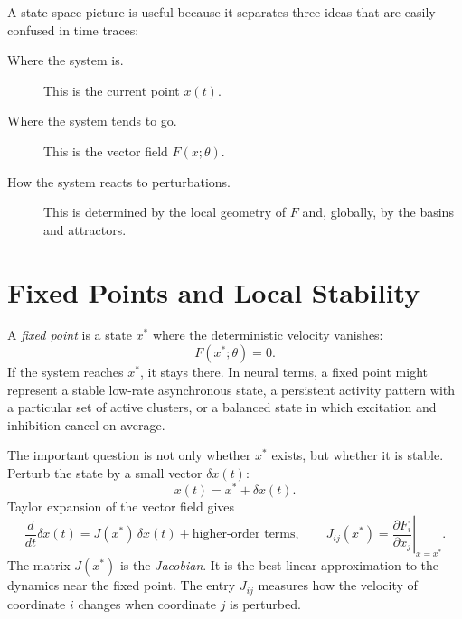 A state-space picture is useful because it separates three ideas that are easily confused in time traces:

\begin{description}
  \item[Where the system is.] This is the current point $x(t)$.
  \item[Where the system tends to go.] This is the vector field $F(x;\theta)$.
  \item[How the system reacts to perturbations.] This is determined by the local geometry of $F$ and, globally, by the basins and attractors.
\end{description}

\section{Fixed Points and Local Stability}
\label{sec:fixed-points-local-stability}

A \emph{fixed point} is a state $x^\ast$ where the deterministic velocity vanishes:
%
\begin{equation}
  F(x^\ast;\theta)=0.
  \label{eq:fixed-point}
\end{equation}
%
If the system reaches $x^\ast$, it stays there. In neural terms, a fixed point might represent a stable low-rate asynchronous state, a persistent activity pattern with a particular set of active clusters, or a balanced state in which excitation and inhibition cancel on average.

The important question is not only whether $x^\ast$ exists, but whether it is stable. Perturb the state by a small vector $\delta x(t)$:
%
\begin{equation}
  x(t) = x^\ast + \delta x(t).
  \label{eq:perturbation-definition}
\end{equation}
%
Taylor expansion of the vector field gives
%
\begin{equation}
  \frac{d}{dt}\delta x(t)
  =
  J(x^\ast)\,\delta x(t)
  + \text{higher-order terms},
  \qquad
  J_{ij}(x^\ast)
  =
  \left.\frac{\partial F_i}{\partial x_j}\right|_{x=x^\ast}.
  \label{eq:linearization-jacobian}
\end{equation}
%
The matrix $J(x^\ast)$ is the \emph{Jacobian}. It is the best linear approximation to the dynamics near the fixed point. The entry $J_{ij}$ measures how the velocity of coordinate $i$ changes when coordinate $j$ is perturbed.

